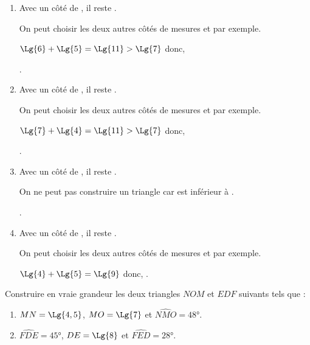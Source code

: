 \begin{Maquette}[Fiche,CorrigeFin,Colonnes=2]{}
\begin{multicols}{2}
      \begin{Solution}
         \begin{enumerate}
            \item Avec un côté de , il reste . \par
               On peut choisir les deux autres côtés de mesures  et  par exemple. \par
               $\Lg{6}+\Lg{5} =\Lg{11} >\Lg{7}$ donc, \par
               . 
            \item Avec un côté de , il reste . \par
               On peut choisir les deux autres côtés de mesures  et  par exemple. \par
               $\Lg{7}+\Lg{4} =\Lg{11} >\Lg{7}$ donc, \par
               . 
            \item Avec un côté de , il reste . \par
               On ne peut pas construire un triangle car  est inférieur à . \par
               .
            \item Avec un côté de , il reste . \par
               On peut choisir les deux autres côtés de mesures  et  par exemple. \par
               $\Lg{4}+\Lg{5} =\Lg{9}$ donc, . 
         \end{enumerate}
      \end{Solution}
      
      
      \begin{exercice} %
         Construire en vraie grandeur les deux triangles $NOM$ et $EDF$ suivants tels que :
         \begin{enumerate}
            \item $MN =\Lg{4,5}$, $MO =\Lg{7}$ et $\widehat{NMO} =\ang{48}$.
            \item $\widehat{FDE} =\ang{45}$, $DE =\Lg{8}$ et $\widehat{FED} =\ang{28}$.
         \end{enumerate}
      \end{exercice}
      

\end{multicols}
\end{Maquette}
